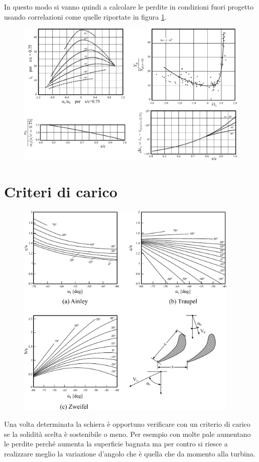In questo modo si vanno quindi a calcolare le perdite in condizioni fuori progetto usando correlazioni come quelle riportate in figura \ref{fig:FuoriProgT1}.
\begin{figure}
\centering
  \includegraphics[width=\textwidth]{fig/FuoriProgT1.pdf}
\caption{}
\label{fig:FuoriProgT1}
\end{figure}

\section{Criteri di carico}
\begin{figure}[h!]
\centering
  \includegraphics[width=0.95\textwidth]{fig/Ainley.pdf}
\caption{}
\label{fig:Ainley}
\end{figure}
Una volta determinata la schiera è opportuno verificare con un criterio di carico se la solidità scelta è sostenibile o meno. Per esempio con molte pale aumentano le perdite perché aumenta la superficie bagnata ma per contro si riesce a realizzare meglio la variazione d'angolo che è quella che da momento alla turbina.


